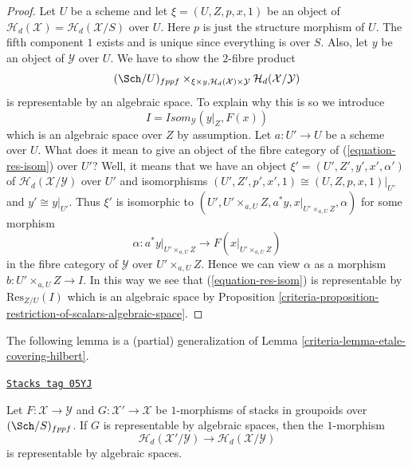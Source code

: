 \begin{proof}

Let $U$ be a scheme and let $\xi = (U, Z, p, x, 1)$ be an object of
$\mathcal{H}_d(\mathcal{X}) = \mathcal{H}_d(\mathcal{X}/S)$ over $U$.
Here $p$ is just the structure morphism of $U$.
The fifth component $1$ exists and is unique
since everything is over $S$.
Also, let $y$ be an object of $\mathcal{Y}$ over $U$.
We have to show the $2$-fibre product
\begin{equation}
\label{equation-res-isom}
(\Sch/U)_{fppf}
\times_{\xi \times y, \mathcal{H}_d(\mathcal{X}) \times \mathcal{Y}}
\mathcal{H}_d(\mathcal{X}/\mathcal{Y})
\end{equation}
is representable by an algebraic space. To explain why this is so
we introduce
$$
I = \mathit{Isom}_\mathcal{Y}(y|_Z, F(x))
$$
which is an algebraic space over $Z$ by assumption. Let $a : U' \to U$
be a scheme over $U$. What does it mean to give an object of the fibre
category of (\ref{equation-res-isom}) over $U'$? Well, it means that we
have an object $\xi' = (U', Z', y', x', \alpha')$ of
$\mathcal{H}_d(\mathcal{X}/\mathcal{Y})$ over $U'$ and isomorphisms
$(U', Z', p', x', 1) \cong (U, Z, p, x, 1)|_{U'}$ and
$y' \cong y|_{U'}$. Thus $\xi'$ is isomorphic to
$(U', U' \times_{a, U} Z, a^*y, x|_{U' \times_{a, U} Z}, \alpha)$
for some morphism
$$
\alpha :
a^*y|_{U' \times_{a, U} Z}
\longrightarrow
F(x|_{U' \times_{a, U} Z})
$$
in the fibre category of $\mathcal{Y}$ over $U' \times_{a, U} Z$. Hence
we can view $\alpha$ as a morphism $b : U' \times_{a, U} Z \to I$.
In this way we see that (\ref{equation-res-isom})
is representable by $\text{Res}_{Z/U}(I)$ which is an algebraic space by
Proposition \ref{criteria-proposition-restriction-of-scalars-algebraic-space}.
\end{proof}

The following lemma is a (partial) generalization of
Lemma \ref{criteria-lemma-etale-covering-hilbert}.

\begin{lemma}
\label{criteria-lemma-representable-on-top}
\href{https://stacks.math.columbia.edu/tag/05YJ}{\texttt{Stacks tag 05YJ}}

Let $F : \mathcal{X} \to \mathcal{Y}$ and $G : \mathcal{X}' \to \mathcal{X}$
be $1$-morphisms of stacks in groupoids over $(\Sch/S)_{fppf}$.
If $G$ is representable by algebraic spaces, then the $1$-morphism
$$
\mathcal{H}_d(\mathcal{X}'/\mathcal{Y})
\longrightarrow
\mathcal{H}_d(\mathcal{X}/\mathcal{Y})
$$
is representable by algebraic spaces.
\end{lemma}

